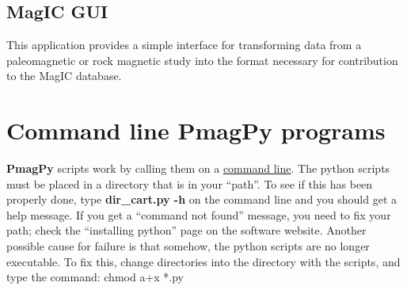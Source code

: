 \documentclass[11pt]{book}
\begin{document}

\subsection{MagIC GUI}

This application provides a simple interface for transforming data from a paleomagnetic or rock magnetic study into the format necessary for contribution to the MagIC database.

\section{Command line PmagPy programs}

{\bf PmagPy}  scripts work by calling them on a \href{#command_line}{command line}.
 The python scripts must be placed in a directory that is in your ``path''.  To see if this has been properly done, type {\bf dir\_cart.py -h} on the command line and you should get a help message.  If you get a ``command not found'' message, you need to fix your path; check the ``installing python'' page on the software website.   Another possible cause for failure is that somehow, the python scripts are no longer executable.  To fix this, change directories into the directory with the scripts, and type the command:  chmod a+x *.py
\end{document}
